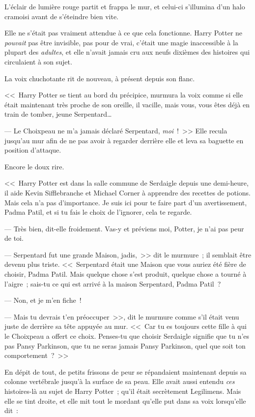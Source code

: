 L'éclair de lumière rouge partit et frappa le mur, et celui-ci s'illumina d'un halo cramoisi avant de s'éteindre bien vite.

Elle ne s'était pas vraiment attendue à ce que cela fonctionne. Harry Potter ne \emph{pouvait} pas être invisible, pas pour de vrai, c'était une magie inaccessible à la plupart des \emph{adultes}, et elle n'avait jamais cru aux neufs dixièmes des histoires qui circulaient à son sujet.

La voix chuchotante rit de nouveau, à présent depuis son flanc.

<<~Harry Potter se tient au bord du précipice, murmura la voix comme si elle était maintenant très proche de son oreille, il vacille, mais vous, vous êtes déjà en train de tomber, jeune Serpentard…

--- Le Choixpeau ne m'a jamais déclaré Serpentard, \emph{moi}~!~>> Elle recula jusqu'au mur afin de ne pas avoir à regarder derrière elle et leva sa baguette en position d'attaque.

Encore le doux rire.

<<~Harry Potter est dans la salle commune de Serdaigle depuis une demi-heure, il aide Kevin Sifflebranche et Michael Corner à apprendre des recettes de potions. Mais cela n'a pas d'importance. Je suis ici pour te faire part d'un avertissement, Padma Patil, et si tu fais le choix de l'ignorer, cela te regarde.

--- Très bien, dit-elle froidement. Vas-y et préviens moi, Potter, je n'ai pas peur de toi.

--- Serpentard fut une grande Maison, jadis,~>> dit le murmure~; il semblait être devenu plus triste. <<~Serpentard était une Maison que vous auriez été fière de choisir, Padma Patil. Mais quelque chose s'est produit, quelque chose a tourné à l'aigre~; sais-tu ce qui est arrivé à la maison Serpentard, Padma Patil~?

--- Non, et je m'en fiche~!

--- Mais tu devrais t'en préoccuper~>>, dit le murmure comme s'il était venu juste de derrière sa tête appuyée au mur. <<~Car tu es toujours cette fille à qui le Choixpeau a offert ce choix. Penses-tu que choisir Serdaigle signifie que tu n'es pas Pansy Parkinson, que tu ne seras jamais Pansy Parkinson, quel que soit ton comportement~?~>>

En dépit de tout, de petits frissons de peur se répandaient maintenant depuis sa colonne vertébrale jusqu'à la surface de sa peau. Elle avait aussi entendu \emph{ces} histoires-là au sujet de Harry Potter~; qu'il était secrètement Legilimens. Mais elle se tint droite, et elle mit tout le mordant qu'elle put dans sa voix lorsqu'elle dit~:

